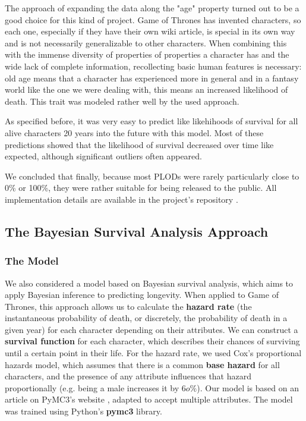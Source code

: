 \documentclass{bioinfo}
\begin{document}
The approach of expanding the data along the "age" property turned out to be a good choice for this kind of project. Game of Thrones has invented characters, so each one, especially if they have their own wiki article, is special in its own way and is not necessarily generalizable to other characters. When combining this with the immense diversity of properties of properties a character has and the wide lack of complete information, recollecting basic human features is necessary: old age means that a character has experienced more in general and in a fantasy world like the one we were dealing with, this means an increased likelihood of death. This trait was modeled rather well by the used approach.

As specified before, it was very easy to predict like likehihoods of survival for all alive characters 20 years into the future with this model. Most of these predictions showed that the likelihood of survival decreased over time like expected, although significant outliers often appeared.

We concluded that finally, because most PLODs were rarely particularly close to 0\% or 100\%, they were rather suitable for being released to the public. All implementation details are available in the project's repository \cite{github-working}.


\subsection{The Bayesian Survival Analysis Approach}
\subsubsection{The Model}
We also considered a model based on Bayesian survival analysis, which aims to apply Bayesian inference to predicting longevity. When applied to Game of Thrones, this approach allows us to calculate the \textbf{hazard rate} (the instantaneous probability of death, or discretely, the probability of death in a given year) for each character depending on their attributes. We can construct a \textbf{survival function} for each character, which describes their chances of surviving until a certain point in their life. For the hazard rate, we used Cox's proportional hazards model, which assumes that there is a common \textbf{base hazard} for all characters, and the presence of any attribute influences that hazard proportionally (e.g. being a male increases it by $6o\%$). Our model is based on an article on PyMC3's website \cite{bayesian-surv}, adapted to accept multiple attributes. The model was trained using Python's \textbf{pymc3} library. \cite{pymc3} 
\end{document}
